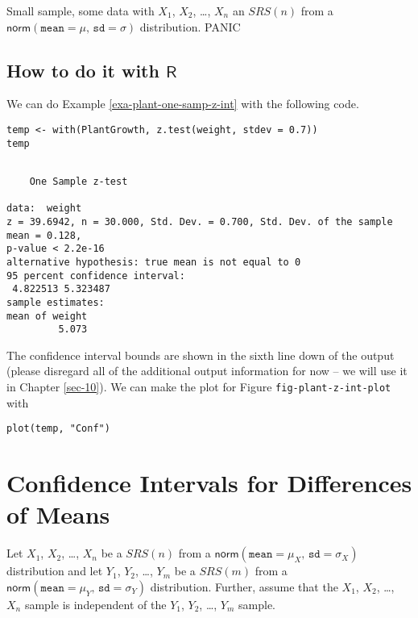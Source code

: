 Small sample, some data with \(X_{1}\), \(X_{2}\), \ldots{}, \(X_{n}\) an
\(SRS(n)\) from a
\(\mathsf{norm}(\mathtt{mean}=\mu,\,\mathtt{sd}=\sigma)\)
distribution.  PANIC

\subsection{How to do it with \(\mathsf{R}\)}
\label{sec-9-2-1}
We can do Example \ref{exa-plant-one-samp-z-int} with the following code.

\begin{verbatim}
temp <- with(PlantGrowth, z.test(weight, stdev = 0.7))
temp
\end{verbatim}

\begin{verbatim}

	One Sample z-test

data:  weight
z = 39.6942, n = 30.000, Std. Dev. = 0.700, Std. Dev. of the sample mean = 0.128,
p-value < 2.2e-16
alternative hypothesis: true mean is not equal to 0
95 percent confidence interval:
 4.822513 5.323487
sample estimates:
mean of weight 
         5.073
\end{verbatim}

The confidence interval bounds are shown in the sixth line down of the
output (please disregard all of the additional output information for
now -- we will use it in Chapter \ref{sec-10}). We can make the
plot for Figure \texttt{fig-plant-z-int-plot} with

\begin{verbatim}
plot(temp, "Conf")
\end{verbatim}

\section{Confidence Intervals for Differences of Means}
\label{sec-9-3}

Let \(X_{1}\), \(X_{2}\), \ldots{}, \(X_{n}\) be a \(SRS(n)\) from a
\(\mathsf{norm}(\mathtt{mean}=\mu_{X},\,\mathtt{sd}=\sigma_{X})\)
distribution and let \(Y_{1}\), \(Y_{2}\), \ldots{}, \(Y_{m}\) be a
\(SRS(m)\) from a
\(\mathsf{norm}(\mathtt{mean}=\mu_{Y},\,\mathtt{sd}=\sigma_{Y})\)
distribution. Further, assume that the \(X_{1}\), \(X_{2}\), \ldots{},
\(X_{n}\) sample is independent of the \(Y_{1}\), \(Y_{2}\), \ldots{},
\(Y_{m}\) sample.

